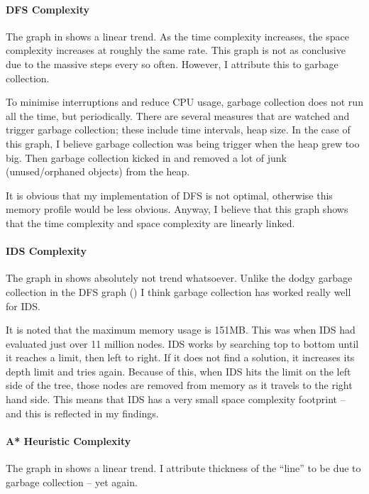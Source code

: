\documentclass[a4paper]{article}
\begin{document}
\paragraph{DFS Complexity}
The graph in  shows a linear trend.
As the time complexity increases, the space complexity increases at roughly the same rate.
This graph is not as conclusive due to the massive steps every so often.
However, I attribute this to garbage collection.

To minimise interruptions and reduce CPU usage, garbage collection does not run all the time, but periodically.
There are several measures that are watched and trigger garbage collection;
  these include time intervals, heap size.
In the case of this graph, I believe garbage collection was being trigger when the heap grew too big.
Then garbage collection kicked in and removed a lot of junk (unused/orphaned objects) from the heap.

It is obvious that my implementation of DFS is not optimal, otherwise this memory profile would be less obvious.
Anyway, I believe that this graph shows that the time complexity and space complexity are linearly linked.

\paragraph{IDS Complexity}
The graph in  shows absolutely not trend whatsoever.
Unlike the dodgy garbage collection in the DFS graph () I think garbage collection has worked really well for IDS.

It is noted that the maximum memory usage is 151MB.
This was when IDS had evaluated just over 11 million nodes.
IDS works by searching top to bottom until it reaches a limit, then left to right.
If it does not find a solution, it increases its depth limit and tries again.
Because of this, when IDS hits the limit on the left side of the tree, those nodes are removed from memory as it travels to the right hand side.
This means that IDS has a very small space complexity footprint -- and this is reflected in my findings.

\paragraph{A* Heuristic Complexity}
The graph in  shows a linear trend.
I attribute thickness of the ``line'' to be due to garbage collection -- yet again.
\end{document}
